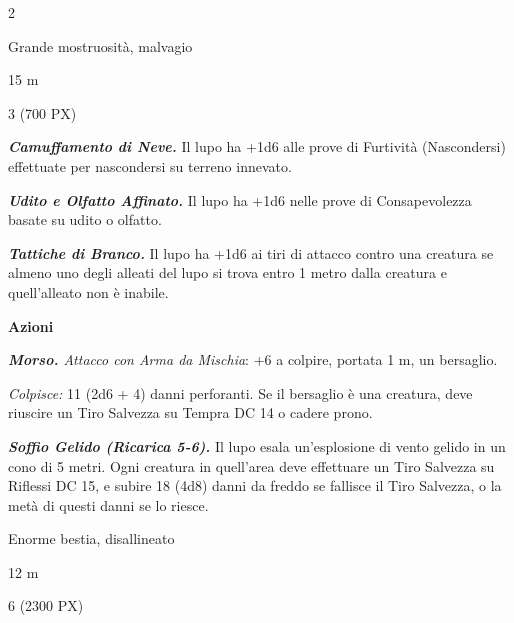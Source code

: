 \begin{multicols}{2}
{
\begin{description}[noitemsep, topsep=0pt, parsep=0pt, partopsep=0pt, itemsep=1pt, leftmargin=2.35cm,  labelwidth=2.2cm, itemindent=0cm, listparindent=0pt] %
\setlength{\baselineskip}{10pt}
\item[\textbf{Taglia/Tipo}] Grande mostruosità, malvagio
\item[\textbf{Caratt.}] 
\item[\textbf{Punti Ferita}] 
\item[\textbf{Tiri Salvez.}] 
\item[\textbf{Movimento}] 15 m
\item[\textbf{Sfida}] 3 (700 PX)
\end{description}
\smallskip

\emph{\textbf{Camuffamento di Neve.}} Il lupo ha +1d6 alle prove di Furtività (Nascondersi) effettuate per nascondersi su terreno innevato.

\emph{\textbf{Udito e Olfatto Affinato.}} Il lupo ha +1d6 nelle prove di Consapevolezza basate su udito o olfatto.

\emph{\textbf{Tattiche di Branco.}} Il lupo ha +1d6 ai tiri di attacco contro una creatura se almeno uno degli alleati del lupo si trova entro 1 metro dalla creatura e quell'alleato non è inabile.

\textbf{Azioni}

\emph{\textbf{Morso.} Attacco con Arma da Mischia}: +6 a colpire, portata 1 m, un bersaglio.

\emph{Colpisce:} 11 (2d6 + 4) danni perforanti. Se il bersaglio è una creatura, deve riuscire un Tiro Salvezza su Tempra DC 14 o cadere prono.

\emph{\textbf{Soffio Gelido (Ricarica 5-6).}} Il lupo esala un'esplosione di vento gelido in un cono di 5 metri. Ogni creatura in quell'area deve effettuare un Tiro Salvezza su Riflessi DC 15, e subire 18 (4d8) danni da freddo se fallisce il Tiro Salvezza, o la metà di questi danni se lo riesce.

\begin{description}[noitemsep, topsep=0pt, parsep=0pt, partopsep=0pt, itemsep=1pt, leftmargin=2.35cm,  labelwidth=2.2cm, itemindent=0cm, listparindent=0pt] %
\setlength{\baselineskip}{10pt}
\item[\textbf{Taglia/Tipo}] Enorme bestia, disallineato
\item[\textbf{Caratt.}] 
\item[\textbf{Punti Ferita}] 
\item[\textbf{Tiri Salvez.}] 
\item[\textbf{Movimento}] 12 m
\item[\textbf{Sfida}] 6 (2300 PX)
\end{description}
\smallskip

}
\end{multicols}
